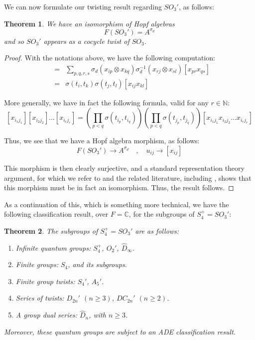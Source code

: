 \documentclass[12pt]{amsbook}
\newtheorem{theorem}{Theorem}[chapter]
\begin{document}
We can now formulate our twisting result regarding $SO_3'$, as follows:

\begin{theorem}
We have an isomorphism of Hopf algebras
$$F(SO_3')=A^{\sigma_d}$$
and so $SO_3'$ appears as a cocycle twist of $SO_3$.
\end{theorem}

\begin{proof} 
With the notations above, we have the following computation:
\begin{eqnarray*}
[x_{ij}][x_{kl}]
&=&\sum_{p,q,r,s} \sigma_d(x_{ip}\otimes x_{kq})\sigma_d^{-1}(x_{rj}\otimes x_{sl})[x_{pr}x_{qs}]\\
&=&\sigma(t_i,t_k)\sigma(t_j,t_l)[x_{ij}x_{kl}] 
\end{eqnarray*}
 
More generally, we have in fact the following formula, valid for any $r\in\mathbb N$:
 $$[x_{i_1j_1}] [x_{i_2j_2}] \ldots [x_{i_rj_r}] = 
 \left(\prod_{p<q}\sigma(t_{i_p},t_{i_q})\right)
 \left(\prod_{p<q}\sigma(t_{j_p},t_{j_q})\right)
 [x_{i_1j_1} x_{i_2j_2} \ldots x_{i_rj_r}]$$
 
Thus, we see that we have a Hopf algebra morphism, as follows:
 $$F(SO_3')\to A^{\sigma_d}\quad,\quad u_{ij}\to[x_{ij}]$$

This morphism is then clearly surjective, and a standard representation theory argument, for which we refer to \cite{bb1} and the related literature, including \cite{bi4}, shows that this morphism must be in fact an isomorphism. Thus, the result follows.
\end{proof}

As a continuation of this, which is something more technical, we have the following classification result, over $F=\mathbb C$, for the subgroups of $S_4^+=SO_3'$:


\begin{theorem}
The subgroups of $S_4^+=SO_3'$ are as follows:
\begin{enumerate}
\item Infinite quantum groups: $S_4^+$, $O_2'$, $\widehat{D}_\infty$.

\item Finite groups: $S_4$, and its subgroups.

\item Finite group twists: $S_4'$, $A_5'$.

\item Series of twists: $D_{2n}'$ $(n\geq 3)$, $DC_{2n}'$ $(n\geq 2)$.

\item A group dual series: $\widehat{D}_n$, with $n\geq 3$.
\end{enumerate}
Moreover, these quantum groups are subject to an ADE classification result.
\end{theorem}
\end{document}
